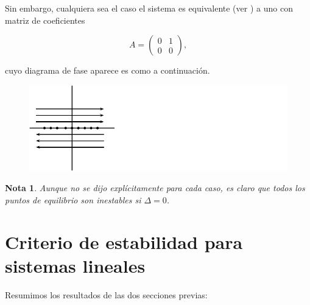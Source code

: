 \documentclass[11pt]{book}
\theoremstyle{definition}
\numberwithin{definition}{section}
\theoremstyle{theorem}
\numberwithin{theorem}{section}
\numberwithin{lemma}{section}
\numberwithin{corollary}{section}
\theoremstyle{plain}
\numberwithin{example}{section}
\newtheorem{remark}{Nota}
\begin{document}
Sin embargo, cualquiera sea el caso el sistema es equivalente (ver \cite[teorema 8.16 p.~239]{dynandbif}) a uno con matriz de coeficientes

$$ A = \left( \begin{array}{ll} 0 & 1 \\ 0 & 0 \end{array} \right),$$

cuyo diagrama de fase aparece es como a continuación.

\begin{figure}[!ht] \centering
    \includegraphics[scale=1.0]{figures/asingularr1.pdf}
\end{figure}

\begin{remark}Aunque no se dijo explícitamente para cada caso, es claro que todos los puntos de equilibrio son \emph{inestables} si $\Delta = 0$.
\end{remark}

\section{Criterio de estabilidad para sistemas lineales}
Resumimos los resultados de las dos secciones previas:
\end{document}

